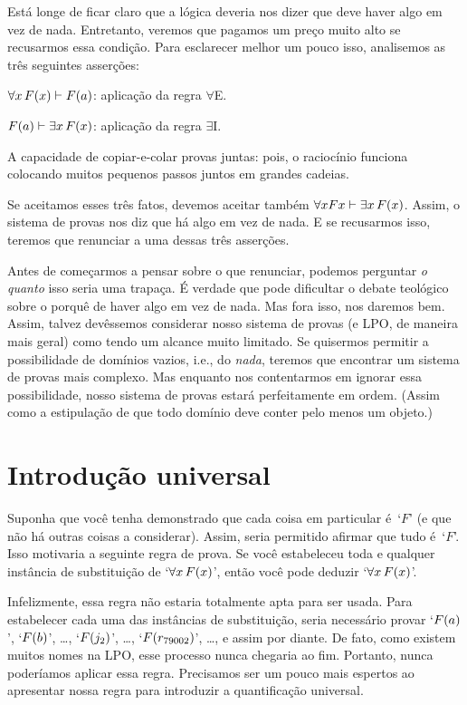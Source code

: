  
Está longe de ficar claro que a lógica deveria nos dizer que deve haver algo em vez de nada. Entretanto, veremos que pagamos um preço muito alto se recusarmos essa condição. Para esclarecer melhor um pouco isso, analisemos as três seguintes asserções:
	\begin{ebullet}
		\item $\forall x\,\mathord{F}(x) \vdash \mathord{F}(a)$:  aplicação da regra  $\forall$E.
		\item $\mathord{F}(a) \vdash \exists x\,\mathord{F}(x)$:  aplicação da regra $\exists$I.
		\item A capacidade de copiar-e-colar provas juntas: pois, o raciocínio funciona colocando muitos pequenos passos juntos em grandes cadeias.
	\end{ebullet}
Se aceitamos esses três fatos, devemos aceitar também $\forall xFx \vdash \exists x\,\mathord{F}(x)$.  Assim, o sistema de provas nos diz que há algo em vez de nada. E se recusarmos isso, teremos que renunciar a uma dessas três asserções. 


Antes de começarmos a pensar sobre o que renunciar, podemos perguntar \emph{o quanto} isso seria uma trapaça. É verdade que pode dificultar o debate teológico sobre o porquê de haver algo em vez de nada. Mas fora isso, nos daremos bem. Assim, talvez devêssemos considerar nosso sistema de provas (e LPO, de maneira mais geral) como tendo um alcance muito limitado. Se quisermos permitir a possibilidade de domínios vazios, i.e., do \emph{nada}, teremos que encontrar um sistema de provas mais complexo. Mas enquanto nos contentarmos em ignorar essa possibilidade, nosso sistema de provas estará perfeitamente em ordem. (Assim como a estipulação de que todo domínio deve conter pelo menos um objeto.)

\section{Introdução universal}
Suponha que você tenha demonstrado que cada coisa em particular é~`$F$' (e que não há outras coisas a considerar). Assim, seria permitido afirmar que tudo é~`$F$'. Isso motivaria a seguinte regra de prova. Se você estabeleceu toda e qualquer instância de substituição de `$\forall x\,\mathord{F}(x)$', então você pode deduzir `$\forall x\,\mathord{F}(x)$'. 
 
 Infelizmente, essa regra não estaria  totalmente apta para ser usada. Para estabelecer cada uma das instâncias de substituição, seria necessário provar  `$\mathord{F}(a)$', `$\mathord{F}(b)$', \dots, `$\mathord{F}(j_2)$', \dots, `$\mathord{F}(r_{79002})$', \ldots, e assim por diante. De fato, como existem muitos nomes na LPO, esse processo nunca chegaria ao fim. Portanto, nunca poderíamos aplicar essa regra. Precisamos ser um pouco mais espertos ao apresentar nossa regra para introduzir a quantificação universal.
 
